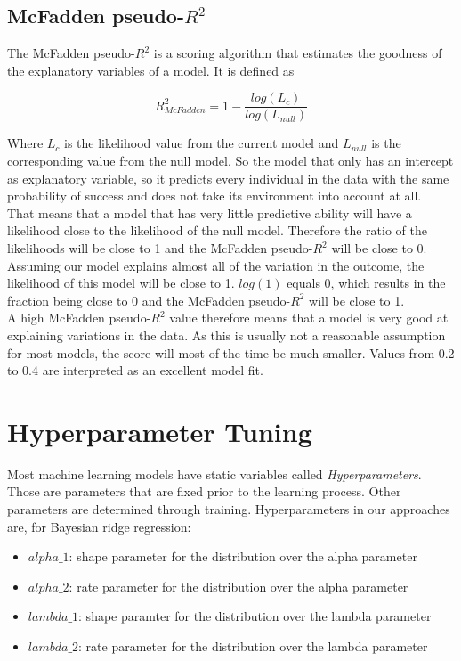 \documentclass[sigconf]{acmart}
\begin{document}
\subsection*{McFadden pseudo-$R^2$}
The McFadden pseudo-$R^2$ is a scoring algorithm that estimates the goodness of the explanatory variables of a model. It is defined as\\
\begin{center}
$$R^2_{McFadden} = 1 - \frac{log(L_c)}{log(L_{null})}$$
\end{center}
Where $L_c$ is the likelihood value from the current model and $L_{null}$ is the corresponding value from the null model. So the model that only has an intercept as explanatory variable, so it predicts every individual in the data with the same probability of success and does not take its environment into account at all.\\
That means that a model that has very little predictive ability will have a likelihood close to the likelihood of the null model. Therefore the ratio of the likelihoods will be close to 1 and the McFadden pseudo-$R^2$ will be close to 0.\\
Assuming our model explains almost all of the variation in the outcome, the likelihood of this model will be close to 1. $log(1)$ equals 0, which results in the fraction being close to 0 and the McFadden pseudo-$R^2$ will be close to 1.\\
A high McFadden pseudo-$R^2$ value therefore means that a model is very good at explaining variations in the data. As this is usually not a reasonable assumption for most models, the score will most of the time be much smaller. Values from 0.2 to 0.4 are interpreted as an excellent model fit.

\section*{Hyperparameter Tuning}
Most machine learning models have static variables called \textit{Hyperparameters}. Those are parameters that are fixed prior to the learning process. Other parameters are determined through training. Hyperparameters in our approaches are, for Bayesian ridge regression:\\
\begin{itemize}
  \item $alpha\_1$: shape parameter for the distribution over the alpha parameter
  \item $alpha\_2$: rate parameter for the distribution over the alpha parameter
  \item $lambda\_1$: shape paramter for the distribution over the lambda parameter
  \item $lambda\_2$: rate parameter for the distribution over the lambda parameter
\end{itemize}
\end{document}
